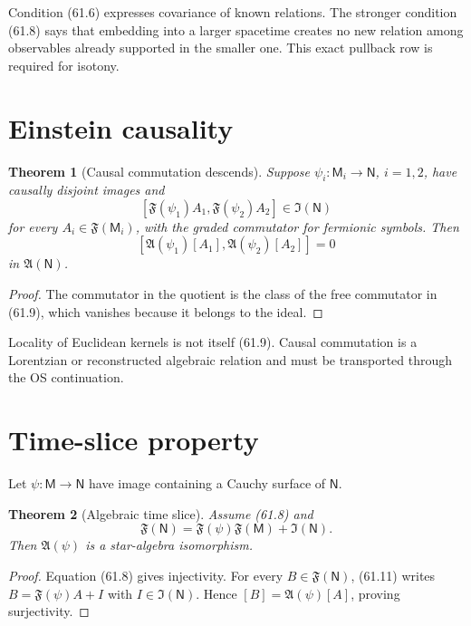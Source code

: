 \documentclass[11pt]{article}
\newtheorem{theorem}{Theorem}[section]
\theoremstyle{remark}
\begin{document}
Condition (61.6) expresses covariance of known relations.  The
stronger condition (61.8) says that embedding into a larger
spacetime creates no new relation among observables already
supported in the smaller one.  This exact pullback row is required
for isotony.

\section{Einstein causality}

\begin{theorem}[Causal commutation descends]
\label{thm:v15v61-causality}
Suppose \(\psi_i:{\mathsf M}_i\to{\mathsf N}\),
\(i=1,2\), have causally disjoint images and
\[
 [{\mathfrak F}(\psi_1)A_1,
   {\mathfrak F}(\psi_2)A_2]
 \in{\mathfrak I}({\mathsf N})                          \tag{61.9}
\]
for every \(A_i\in{\mathfrak F}({\mathsf M}_i)\), with the graded
commutator for fermionic symbols.  Then
\[
 [{\mathfrak A}(\psi_1)[A_1],
   {\mathfrak A}(\psi_2)[A_2]]=0                        \tag{61.10}
\]
in \({\mathfrak A}({\mathsf N})\).
\end{theorem}

\begin{proof}
The commutator in the quotient is the class of the free commutator
in (61.9), which vanishes because it belongs to the ideal.
\end{proof}

Locality of Euclidean kernels is not itself (61.9).  Causal
commutation is a Lorentzian or reconstructed algebraic relation and
must be transported through the OS continuation.

\section{Time-slice property}

Let \(\psi:{\mathsf M}\to{\mathsf N}\) have image containing a
Cauchy surface of \({\mathsf N}\).

\begin{theorem}[Algebraic time slice]
\label{thm:v15v61-timeslice}
Assume (61.8) and
\[
 {\mathfrak F}({\mathsf N})
 ={\mathfrak F}(\psi){\mathfrak F}({\mathsf M})
  +{\mathfrak I}({\mathsf N}).                          \tag{61.11}
\]
Then \({\mathfrak A}(\psi)\) is a star-algebra isomorphism.
\end{theorem}

\begin{proof}
Equation (61.8) gives injectivity.  For every
\(B\in{\mathfrak F}({\mathsf N})\), (61.11) writes
\(B={\mathfrak F}(\psi)A+I\) with
\(I\in{\mathfrak I}({\mathsf N})\).  Hence
\([B]={\mathfrak A}(\psi)[A]\), proving surjectivity.
\end{proof}
\end{document}
